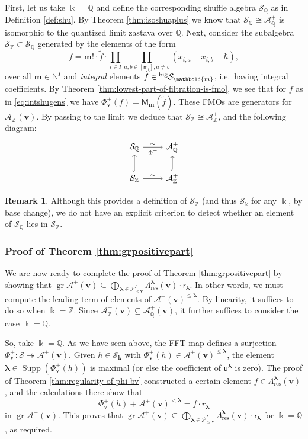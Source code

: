 \documentclass[11pt,reqno]{amsart}
\renewcommand{\mathbf}{\mathbold}
\numberwithin{equation}{section}
\theoremstyle{definition}
\newtheorem{Remark}[equation]{Remark}
\newcommand{\cA}{\mathcal{A}}
\newcommand{\cP}{\mathcal{P}}
\newcommand{\cS}{\mathcal{S}}
\newcommand{\bk}{\mathbf{k}}
\newcommand{\bm}{\mathbf{m}}
\newcommand{\bv}{\mathbf{v}}
\newcommand{\NN}{\mathbb{N}}
\newcommand{\QQ}{\mathbb{Q}}
\newcommand{\ZZ}{\mathbb{Z}}
\renewcommand{\tilde}[1]{\widetilde{#1}}
\newcommand{\leftexp}[2]{\vphantom{#2}^{#1} #2}
\DeclareMathOperator{\supp}{Supp}
\DeclareMathOperator{\gr}{gr}
\newcommand{\kk}{\Bbbk}
\renewcommand{\bv}{\mathbf{v}} %
\newcommand{\sm}{\mathsf{m}}
\newcommand{\M}{\mathsf{M}}
\newcommand{\sfu}{\mathsf{u}}
\newcommand{\sfr}{{\mathsf{r}}}
\newcommand{\vertexset}{I}
\newcommand{\GT}{\Lambda}
\newcommand{\Partitions}{\cP}
\newcommand{\bla}{{\boldsymbol{\lambda}}}
\newcommand{\qzastplus}{\cA^{+}}
\newcommand{\res}{\mathrm{res}}
\newcommand{\shu}{\cS}
\newcommand{\preshu}{\leftexp{\mathrm{big}}{\cS}}
\begin{document}
First, let us take $\kk = \QQ$ and define the corresponding shuffle algebra $\shu_\QQ$ as in Definition \ref{def:shu}.  By Theorem \ref{thm:isoshuaplus} we know that $\shu_\QQ \cong \qzastplus_\QQ$ is isomorphic to the quantized limit zastava over $\QQ$.  
Next, consider the subalgebra $\shu_\ZZ \subset \shu_\QQ$ generated by the elements of the form
\begin{equation}
    \label{eq:intshugens}
    f = \bm! \cdot \tilde{f} \cdot\prod_{i \in \vertexset} \prod_{a,b \in [\sm_i], a \neq b} (x_{i,a} - x_{i,b} - \hbar),
\end{equation}
over all  $\bm \in \NN^\vertexset$ and \emph{integral} elements $\tilde{f} \in \preshu_{\bm}$, i.e.~having integral coefficients. By Theorem \ref{thm:lowest-part-of-filtration-is-fmo}, we see that for $f$ as in \eqref{eq:intshugens} we have $\Phi^+_\bv(f) = \M_\bm(\tilde{f})$.  These FMOs are generators for $\qzastplus_\ZZ(\bv)$. By passing to the limit we deduce that $\shu_\ZZ \cong \qzastplus_\ZZ $, and the following diagram:
\begin{equation}
    \begin{tikzcd}
        \shu_\QQ \ar[r,"\Phi^+"',"\sim"] & \qzastplus_\QQ \\
        \shu_\ZZ \ar[u,hook] \ar[r,"\sim"]  &  \qzastplus_\ZZ \ar[u,hook]  
    \end{tikzcd}
\end{equation}
\begin{Remark}
    Although this provides a definition of $\shu_\ZZ$ (and thus $\shu_\kk$ for any $\kk$, by base change), we do not have an explicit criterion to detect whether an element of $\shu_\QQ$ lies in $\shu_\ZZ$.
\end{Remark}


\subsubsection{Proof  of Theorem \ref{thm:grpositivepart}}
\label{ssec:proofgrAplus}
We are now ready to complete the proof of Theorem \ref{thm:grpositivepart} by showing that $\gr \qzastplus(\bv) \subseteq \bigoplus_{\bla \in \Partitions_{\leq \bv}^\vertexset} \GT_{\res}^\bla(\bv) \cdot \sfr_\bla$. In other words, we must compute the leading term of elements of $\qzastplus(\bv)^{\leq \bla}$.  By linearity, it suffices to do so when $\kk = \ZZ$.  Since $\qzastplus_\ZZ(\bv) \subseteq \qzastplus_\QQ(\bv)$, it further suffices to consider the case $\kk = \QQ$. 

So, take $\kk = \QQ$. As we have seen above, the FFT map defines a surjection $\Phi_\bv^+:\shu \twoheadrightarrow \qzastplus(\bv)$. Given $h \in \shu_\bk$ with $\Phi_\bv^+(h) \in \qzastplus(\bv)^{\leq\bla}$, the element   $\bla \in\overline{\supp(\Phi^+_\bv(h))}$ is maximal (or else the coefficient of $\sfu^\bla$ is zero). The proof of Theorem \ref{thm:regularity-of-phi-bv} constructed a certain element $f \in \GT^\bla_\res(\bv)$,  and the calculations there show that
$$
\Phi_\bv^+(h) + \qzastplus(\bv)^{<\bla} = f \cdot r_\bla 
$$
in $\gr \qzastplus(\bv)$.  This proves that $\gr \qzastplus(\bv) \subseteq \bigoplus_{\bla \in \Partitions_{\leq \bv}^\vertexset} \GT_{\res}^\bla(\bv) \cdot \sfr_\bla$ for $\kk = \QQ$, as required.
\end{document}
